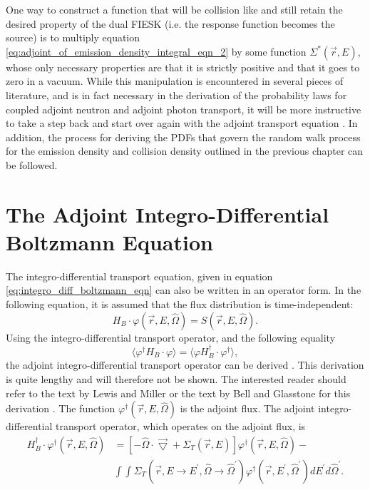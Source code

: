 One way to construct a function that will be collision like and still retain
the desired property of the dual FIESK (i.e. the response function 
becomes the source) is to multiply equation 
\ref{eq:adjoint_of_emission_density_integral_eqn_2} by some function 
$\Sigma^{*}(\vec{r},E)$, whose only necessary properties are that it is
strictly positive and that it goes to zero in a vacuum. While this manipulation
is encountered in several pieces of literature, and is in fact necessary in
the derivation of the probability laws for coupled adjoint neutron and adjoint 
photon transport, it will be more instructive to take a step back and start over
again with the adjoint transport equation 
\citep{kalos_monte_1968, eriksson_monte_1969, hoogenboom_methodology_2003}. In 
addition, the process for deriving the PDFs that govern the random walk process 
for the emission density and collision density outlined in the previous chapter 
can be followed. 

\section{The Adjoint Integro-Differential Boltzmann Equation}
The integro-differential transport equation, given in equation 
\ref{eq:integro_diff_boltzmann_eqn} can also be written in an operator form. 
In the following equation, it is assumed that the flux distribution is 
time-independent:
\begin{equation}
  H_B \cdot \varphi(\vec{r},E,\hat{\Omega}) = S(\vec{r},E,\hat{\Omega}).
\end{equation}
Using the integro-differential transport operator, and the following
equality
\begin{equation}
  \langle \varphi^{\dagger}H_B \cdot \varphi \rangle = 
  \langle \varphi H_B^{\dagger} \cdot \varphi^{\dagger} \rangle,
\end{equation}
the adjoint integro-differential transport operator can be derived
\citep{lewis_computational_1993, bell_nuclear_1979}. This derivation is quite 
lengthy and will therefore not be shown. The interested reader should refer to 
the text by Lewis and Miller or the text by Bell and Glasstone for this 
derivation \citep{lewis_computational_1993, bell_nuclear_1979}. The function 
$\varphi^{\dagger}(\vec{r},E,\hat{\Omega})$ is the adjoint flux. The adjoint
integro-differential transport operator, which operates on the adjoint flux,
is
\begin{equation}
  \begin{split}
    H_B^{\dagger} \cdot \varphi^{\dagger}(\vec{r},E,\hat{\Omega}) &= 
    \left[ -\hat{\Omega} \cdot \vec{\bigtriangledown} +
     \Sigma_T(\vec{r},E) \right] \varphi^{\dagger}(\vec{r},E,\hat{\Omega}) - \\
     & \int\int \Sigma_T(\vec{r},E \to E^{'},\hat{\Omega} \to \hat{\Omega}^{'})
    \varphi^{\dagger}(\vec{r},E^{'},\hat{\Omega}^{'}) dE^{'} d\hat{\Omega}^{'}.
  \end{split}
  \label{eq:integro_diff_adj_trans_op}
\end{equation}

